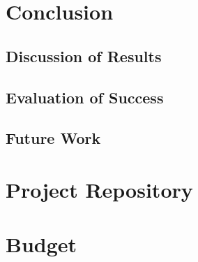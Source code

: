 \documentclass[
    11pt,           %
    letterpaper,    %
    oneside         %
]{report}           %
\begin{document}
\chapter{Conclusion}
    \section{Discussion of Results}
    \section{Evaluation of Success}
    \section{Future Work}




\begin{appendices}

\chapter{Project Repository}
    \label{appendix:repository}
    

\chapter{Budget}

\end{appendices}
\clearpage
\listoftodos
\end{document}
